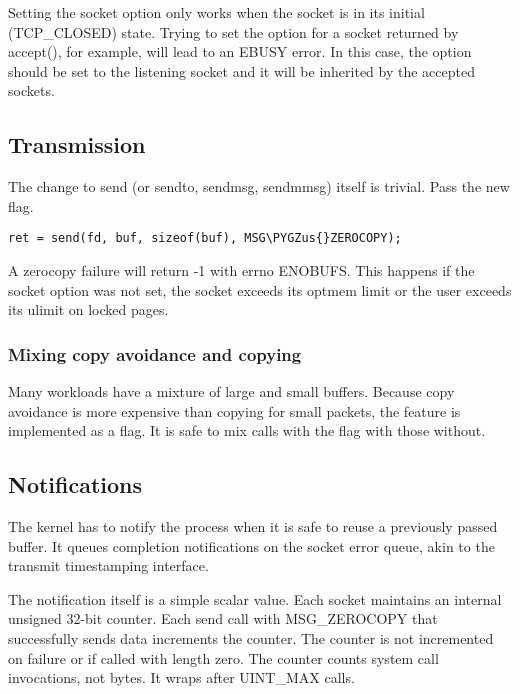 \documentclass[a4paper,8pt,english]{sphinxmanual}
\def\PYGZus{\char`\_}
\begin{document}
Setting the socket option only works when the socket is in its initial
(TCP\_CLOSED) state.  Trying to set the option for a socket returned by accept(),
for example, will lead to an EBUSY error. In this case, the option should be set
to the listening socket and it will be inherited by the accepted sockets.


\subsection{Transmission}
\label{networking/msg_zerocopy:transmission}
The change to send (or sendto, sendmsg, sendmmsg) itself is trivial.
Pass the new flag.

\begin{Verbatim}[commandchars=\\\{\}]
ret = send(fd, buf, sizeof(buf), MSG\PYGZus{}ZEROCOPY);
\end{Verbatim}

A zerocopy failure will return -1 with errno ENOBUFS. This happens if
the socket option was not set, the socket exceeds its optmem limit or
the user exceeds its ulimit on locked pages.


\subsubsection{Mixing copy avoidance and copying}
\label{networking/msg_zerocopy:mixing-copy-avoidance-and-copying}
Many workloads have a mixture of large and small buffers. Because copy
avoidance is more expensive than copying for small packets, the
feature is implemented as a flag. It is safe to mix calls with the flag
with those without.


\subsection{Notifications}
\label{networking/msg_zerocopy:notifications}
The kernel has to notify the process when it is safe to reuse a
previously passed buffer. It queues completion notifications on the
socket error queue, akin to the transmit timestamping interface.

The notification itself is a simple scalar value. Each socket
maintains an internal unsigned 32-bit counter. Each send call with
MSG\_ZEROCOPY that successfully sends data increments the counter. The
counter is not incremented on failure or if called with length zero.
The counter counts system call invocations, not bytes. It wraps after
UINT\_MAX calls.
\end{document}
